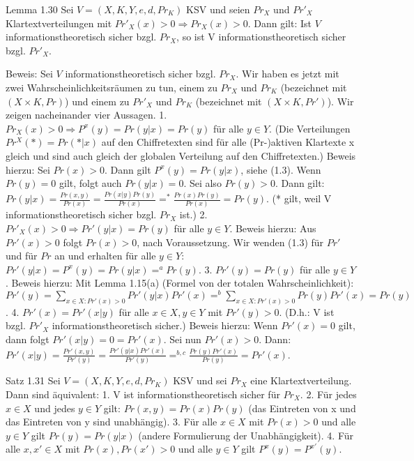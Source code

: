 \documentclass[a4paper]{article}
\begin{document}
\begin{multicols}{3}
    Lemma 1.30 Sei $V=(X,K,Y,e,d,Pr_K)$ KSV und seien $Pr_X$ und $Pr′_X$ Klartextverteilungen mit $Pr′_X(x)>0\Rightarrow Pr_X(x)>0$. Dann gilt: Ist $V$ informationstheoretisch sicher bzgl. $Pr_X$, so ist V informationstheoretisch sicher bzgl. $Pr′_X$.

    Beweis: Sei $V$ informationstheoretisch sicher bzgl. $Pr_X$. Wir haben es jetzt mit zwei Wahrscheinlichkeitsräumen zu tun, einem zu $Pr_X$ und $Pr_K$ (bezeichnet mit $(X\times K,Pr)$) und einem zu $Pr′_X$ und $Pr_K$ (bezeichnet mit $(X\times K,Pr′)$).
    Wir zeigen nacheinander vier Aussagen.
    1. $Pr_X(x)> 0 \Rightarrow P^x(y) = Pr(y|x) = Pr(y)$ für alle $y\in Y$. (Die Verteilungen $Pr^X(*)=Pr(*|x)$ auf den Chiffretexten sind für alle (Pr-)aktiven Klartexte x gleich und sind auch gleich der globalen Verteilung auf den Chiffretexten.) Beweis hierzu: Sei $Pr(x)>0$. Dann gilt $P^x(y)=Pr(y|x)$, siehe (1.3). Wenn $Pr(y)=0$ gilt, folgt auch $Pr(y|x)=0$. Sei also $Pr(y)>0$. Dann gilt: $Pr(y|x) =\frac{Pr(x,y)}{Pr(x)}=\frac{Pr(x|y)Pr(y)}{Pr(x)}=^* \frac{Pr(x)Pr(y)}{Pr(x)}= Pr(y)$. (* gilt, weil V informationstheoretisch sicher bzgl. $Pr_X$ ist.)
    2. $Pr′_X(x)> 0 \Rightarrow Pr′(y|x) = Pr(y)$ für alle $y\in Y$. Beweis hierzu: Aus $Pr′(x)>0$ folgt $Pr(x)>0$, nach Voraussetzung. Wir wenden (1.3) für $Pr′$ und für $Pr$ an und erhalten für alle $y\in Y$: $Pr′(y|x)=P^x(y)=Pr(y|x)=^a Pr(y)$.
    3. $Pr′(y)=Pr(y)$ für alle $y\in Y$. Beweis hierzu: Mit Lemma 1.15(a) (Formel von der totalen Wahrscheinlichkeit): $Pr′(y)=\sum_{x\in X: Pr′(x)> 0} Pr′(y|x)Pr′(x)=^b \sum_{x\in X: Pr′(x)> 0} Pr(y)Pr′(x) = Pr(y)$.
    4. $Pr′(x)=Pr′(x|y)$ für alle $x\in X,y\in Y$ mit $Pr′(y)>0$. (D.h.: V ist bzgl. $Pr′_X$ informationstheoretisch sicher.) Beweis hierzu: Wenn $Pr′(x)=0$ gilt, dann folgt $Pr′(x|y)=0=Pr′(x)$. Sei nun $Pr′(x)>0$. Dann: $Pr′(x|y)=\frac{Pr′(x,y)}{Pr′(y)}=\frac{Pr′(y|x)Pr′(x)}{Pr′(y)}=^{b,c} \frac{Pr(y)Pr′(x)}{Pr(y)} = Pr′(x)$.

    Satz 1.31 Sei $V=(X,K,Y,e,d,Pr_K)$ KSV und sei $Pr_X$ eine Klartextverteilung. Dann sind äquivalent:
    1. V ist informationstheoretisch sicher für $Pr_X$.
    2. Für jedes $x\in X$ und jedes $y\in Y$ gilt: $Pr(x,y)=Pr(x)Pr(y)$ (das Eintreten von x und das Eintreten von y sind unabhängig).
    3. Für alle $x\in X$ mit $Pr(x)>0$ und alle $y\in Y$ gilt $Pr(y)=Pr(y|x)$ (andere Formulierung der Unabhängigkeit).
    4. Für alle $x,x′\in X$ mit $Pr(x),Pr(x′)>0$ und alle $y\in Y$ gilt $P^x(y)=P^{x′}(y)$.


\end{multicols}
\end{document}

